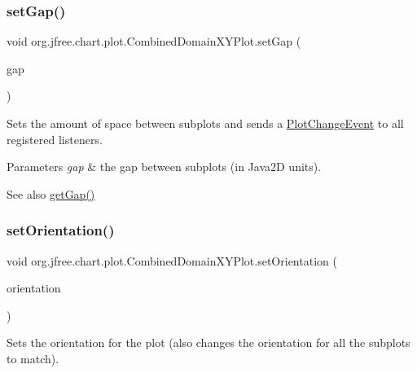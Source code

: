\subsubsection{\texorpdfstring{set\+Gap()}{setGap()}}
{\footnotesize\ttfamily void org.\+jfree.\+chart.\+plot.\+Combined\+Domain\+X\+Y\+Plot.\+set\+Gap (\begin{DoxyParamCaption}\item[{double}]{gap }\end{DoxyParamCaption})}

Sets the amount of space between subplots and sends a \mbox{\hyperlink{}{Plot\+Change\+Event}} to all registered listeners.


\begin{DoxyParams}{Parameters}
{\em gap} & the gap between subplots (in Java2D units).\\
\hline
\end{DoxyParams}
\begin{DoxySeeAlso}{See also}
\mbox{\hyperlink{classorg_1_1jfree_1_1chart_1_1plot_1_1_combined_domain_x_y_plot_a382bed0c0682b03a2418721cd26f4243}{get\+Gap()}} 
\end{DoxySeeAlso}
\mbox{\label{classorg_1_1jfree_1_1chart_1_1plot_1_1_combined_domain_x_y_plot_ac5f8a30878038e688400370dbc831b59}} 
\subsubsection{\texorpdfstring{set\+Orientation()}{setOrientation()}}
{\footnotesize\ttfamily void org.\+jfree.\+chart.\+plot.\+Combined\+Domain\+X\+Y\+Plot.\+set\+Orientation (\begin{DoxyParamCaption}\item[{\mbox{\hyperlink{classorg_1_1jfree_1_1chart_1_1plot_1_1_plot_orientation}{Plot\+Orientation}}}]{orientation }\end{DoxyParamCaption})}

Sets the orientation for the plot (also changes the orientation for all the subplots to match).


